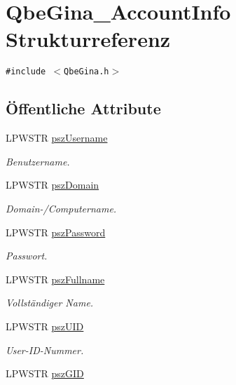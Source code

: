 \hypertarget{structQbeGina__AccountInfo}{
\section{Qbe\-Gina\_\-Account\-Info Strukturreferenz}
\label{structQbeGina__AccountInfo}
}
{\tt \#include $<$Qbe\-Gina.h$>$}

\subsection*{\"{O}ffentliche Attribute}
\begin{CompactItemize}
\item 
LPWSTR \hyperlink{structQbeGina__AccountInfo_QbeGina__AccountInfoo0}{psz\-Username}
\begin{CompactList}\small\item\em Benutzername. \item\end{CompactList}\item 
LPWSTR \hyperlink{structQbeGina__AccountInfo_QbeGina__AccountInfoo1}{psz\-Domain}
\begin{CompactList}\small\item\em Domain-/Computername. \item\end{CompactList}\item 
LPWSTR \hyperlink{structQbeGina__AccountInfo_QbeGina__AccountInfoo2}{psz\-Password}
\begin{CompactList}\small\item\em Passwort. \item\end{CompactList}\item 
LPWSTR \hyperlink{structQbeGina__AccountInfo_QbeGina__AccountInfoo3}{psz\-Fullname}
\begin{CompactList}\small\item\em Vollst\"{a}ndiger Name. \item\end{CompactList}\item 
LPWSTR \hyperlink{structQbeGina__AccountInfo_QbeGina__AccountInfoo4}{psz\-UID}
\begin{CompactList}\small\item\em User-ID-Nummer. \item\end{CompactList}\item 
LPWSTR \hyperlink{structQbeGina__AccountInfo_QbeGina__AccountInfoo5}{psz\-GID}

\end{CompactItemize}
